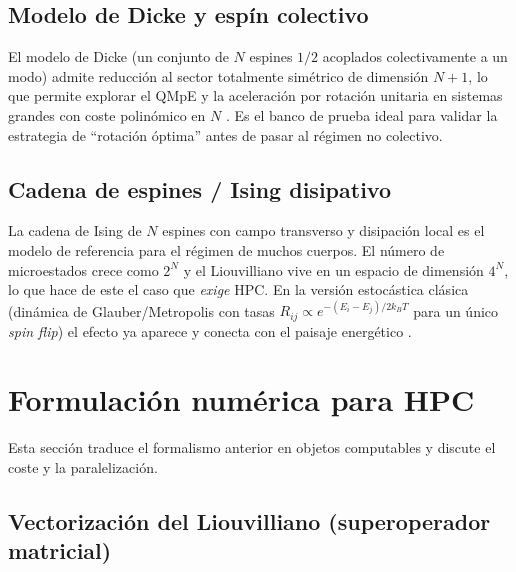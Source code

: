 \documentclass[11pt,a4paper]{article}
\theoremstyle{definition}
\theoremstyle{plain}
\begin{document}
\subsection{Modelo de Dicke y espín colectivo}

El modelo de Dicke (un conjunto de $N$ espines $1/2$ acoplados colectivamente a un modo) admite reducción al
sector totalmente simétrico de dimensión $N+1$, lo que permite explorar el QMpE y la aceleración por
rotación unitaria en sistemas grandes con coste polinómico en $N$ \cite{Carollo2021}. Es el banco de prueba
ideal para validar la estrategia de ``rotación óptima'' antes de pasar al régimen no colectivo.

\subsection{Cadena de espines / Ising disipativo}

La cadena de Ising de $N$ espines con campo transverso y disipación local es el modelo de referencia para el
régimen de muchos cuerpos. El número de microestados crece como $2^N$ y el Liouvilliano vive en un espacio
de dimensión $4^N$, lo que hace de este el caso que \emph{exige} HPC. En la versión estocástica clásica
(dinámica de Glauber/Metropolis con tasas $R_{ij}\propto e^{-(E_i-E_j)/2k_BT}$ para un único \emph{spin
flip}) el efecto ya aparece y conecta con el paisaje energético \cite{LuRaz2017,KlichRaz2019}.

\section{Formulación numérica para HPC}

Esta sección traduce el formalismo anterior en objetos computables y discute el coste y la paralelización.

\subsection{Vectorización del Liouvilliano (superoperador matricial)}
\end{document}
